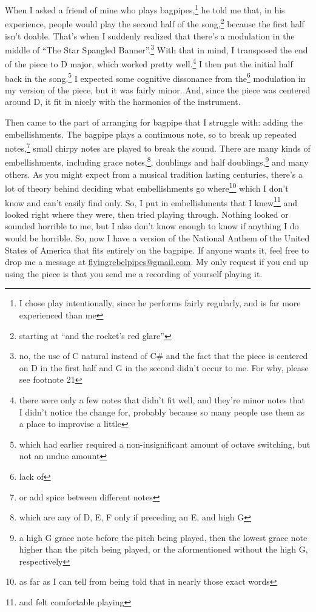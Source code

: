 \documentclass[12pt]{article}[titlepage]
\newcommand{\say}[1]{``#1''}
\newcommand{\1}{\={a}}
\newcommand{\2}{\={e}}
\newcommand{\3}{\={\i}}
\newcommand{\4}{\=o}
\newcommand{\5}{\=u}
\newcommand{\6}{\={A}}
\renewcommand{\,}{\textsuperscript{,}}
\begin{document}
When I asked a friend of mine who plays bagpipes,\footnote{I chose play intentionally, since he performs fairly regularly, and is far more experienced than me} he told me that, in his experience, people would play the second half of the song,\footnote{starting at \say{and the rocket's red glare}} because the first half isn't doable.
That's when I suddenly realized that there's a modulation in the middle of \say{The Star Spangled Banner}.\footnote{no, the use of C natural instead of C\# and the fact that the piece is centered on D in the first half and G in the second didn't occur to me. For why, please see footnote 21}
With that in mind, I transposed the end of the piece to D major, which worked pretty well.\footnote{there were only a few notes that didn't fit well, and they're minor notes that I didn't notice the change for, probably because so many people use them as a place to improvise a little}
I then put the initial half back in the song.\footnote{which had earlier required a non-insignificant amount of octave switching, but not an undue amount}
I expected some cognitive dissonance from the\footnote{lack of} modulation in my version of the piece, but it was fairly minor.
And, since the piece was centered around D, it fit in nicely with the harmonics of the instrument.

Then came to the part of arranging for bagpipe that I struggle with: adding the embellishments.
The bagpipe plays a continuous note, so to break up repeated notes,\footnote{or add spice between different notes} small chirpy notes are played to break the sound.
There are many kinds of embellishments, including grace notes,\footnote{which are any of D, E, F only if preceding an E, and high G}, doublings and half doublings,\footnote{a high G grace note before the pitch being played, then the lowest grace note higher than the pitch being played, or the aformentioned without the high G, respectively} and many others.
As you might expect from a musical tradition lasting centuries, there's a lot of theory behind deciding what embellishments go where\footnote{as far as I can tell from being told that in nearly those exact words} which I don't know and can't easily find only.
So, I put in embellishments that I knew\footnote{and felt comfortable playing} and looked right where they were, then tried playing through.
Nothing looked or sounded horrible to me, but I also don't know enough to know if anything I do would be horrible.
So, now I have a version of the National Anthem of the United States of America that fits entirely on the bagpipe.
If anyone wants it, feel free to drop me a message at \href{mailto:flyingrebelpipes@gmail.com}{flyingrebelpipes@gmail.com}.
My only request if you end up using the piece is that you send me a recording of yourself playing it.
\end{document}
